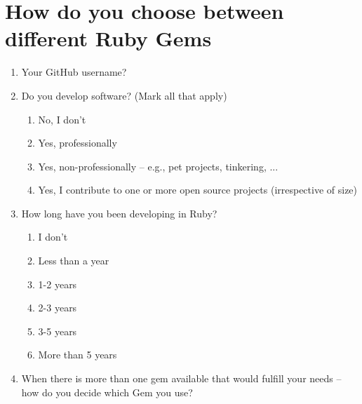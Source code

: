 \appendix
\chapter{How do you choose between different Ruby Gems}

\begin{enumerate}
  \item \hspace{1pt} Your GitHub username?

  \item \hspace{1pt} Do you develop software? (Mark all that apply)
  \begin{enumerate}
	\item \hspace{1pt} No, I don't
    \item \hspace{1pt} Yes, professionally
    \item \hspace{1pt} Yes, non-professionally -- e.g., pet projects, tinkering, ...
    \item \hspace{1pt} Yes, I contribute to one or more open source projects (irrespective of size)
  \end{enumerate}

  \item \hspace{1pt} How long have you been developing in Ruby?
    \begin{enumerate}
      \item \hspace{1pt} I don't
      \item \hspace{1pt} Less than a year
      \item \hspace{1pt} 1-2 years
      \item \hspace{1pt} 2-3 years
      \item \hspace{1pt} 3-5 years
      \item \hspace{1pt} More than 5 years
    \end{enumerate}

  \item \hspace{1pt} When there is more than one gem available that would fulfill your needs -- how do you decide which Gem you use?


\end{enumerate}
